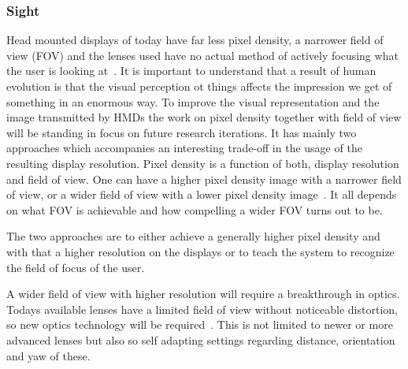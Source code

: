 
\subsubsection{Sight}

Head mounted displays of today have far less pixel density, a narrower field of view (FOV) and the lenses used have no actual method of actively focusing what the user is looking at~\cite{online:oculusKeynote}.\newline
It is important to understand that a result of human evolution is that the visual perception ot things affects the impression we get of something in an enormous way. \newline
To improve the visual representation and the image transmitted by HMDs the work on pixel density together with field of view will be standing in focus on future research iterations. It has mainly two approaches which accompanies an interesting trade-off in the usage of the resulting display resolution. Pixel density is a function of both, display resolution and field of view. One can have a higher pixel density image with a narrower field of view, or a wider field of view with a lower pixel density image~\cite{online:oculusKeynote}. \newline
It all depends on what FOV is achievable and how compelling a wider FOV turns out to be.

The two approaches are to either achieve a generally higher pixel density and with that a higher resolution on the displays or to teach the system to recognize the field of focus of the user.

A wider field of view with higher resolution will require a breakthrough in optics. Todays available lenses have a limited field of view without noticeable distortion, so new optics technology will be required~\cite{online:oculusKeynote}. This is not limited to newer or more advanced lenses but also so self adapting settings regarding distance, orientation and yaw of these. 

